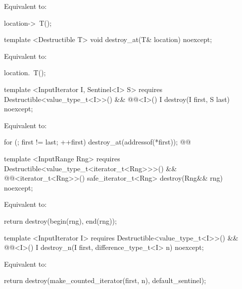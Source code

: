 \setcounter{Paras}{0}
\pnum
\effects Equivalent to:
\begin{codeblock}
        location->~T();
\end{codeblock}

{\color{addclr}
\begin{codeblock}
template <Destructible T>
  void destroy_at(T& location) noexcept;
\end{codeblock}

\pnum
\effects Equivalent to:
\begin{codeblock}
        location.~T();
\end{codeblock}

\begin{codeblock}
template <InputIterator I, Sentinel<I> S>
  requires Destructible<value_type_t<I>>() &&
           @@<I>()
    I destroy(I first, S last) noexcept;
\end{codeblock}
}

\pnum
\effects Equivalent to:
\begin{codeblock}
        for (; first != last; ++first)
          destroy_at(addressof(*first));
        @@
\end{codeblock}

{\color{addclr}
\begin{codeblock}
template <InputRange Rng>
  requires Destructible<value_type_t<iterator_t<Rng>>>() &&
           @@<iterator_t<Rng>>()
    safe_iterator_t<Rng> destroy(Rng&& rng) noexcept;
\end{codeblock}

\pnum
\effects Equivalent to:
\begin{codeblock}
        return destroy(begin(rng), end(rng));
\end{codeblock}

\begin{codeblock}
template <InputIterator I>
  requires Destructible<value_type_t<I>>() &&
           @@<I>()
    I destroy_n(I first, difference_type_t<I> n) noexcept;
\end{codeblock}

\pnum
\effects Equivalent to:
\begin{codeblock}
        return destroy(make_counted_iterator(first, n), default_sentinel{});
\end{codeblock}
} %